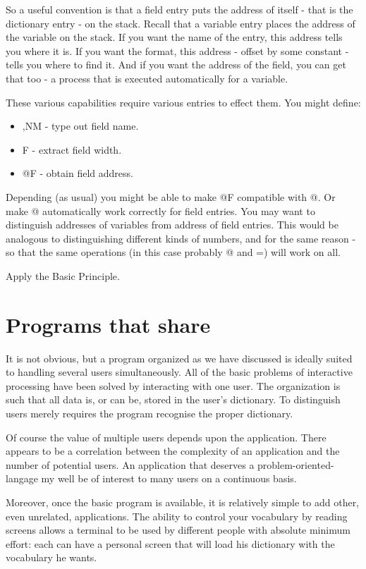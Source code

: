 \documentclass[b5paper, oneside]{book}
\begin{document}
So a useful convention is that a field entry puts the address of itself - that is the dictionary entry - on the stack. Recall that a variable entry places the address of the variable on the stack. If you want the name of the entry, this address tells you where it is. If you want the format, this address - offset by some constant - tells you where to find it. And if you want the address of the field, you can get that too - a process that is executed automatically for a variable.

These various capabilities require various entries to effect them. You might define:\begin{itemize}
   \item ,NM - type out field name.
   \item F - extract field width.
   \item @F - obtain field address.\end{itemize}
Depending (as usual) you might be able to make @F compatible with @. Or make @ automatically work correctly for field entries. You may want to distinguish addresses of variables from address of field entries. This would be analogous to distinguishing different kinds of numbers, and for the same reason - so that the same operations (in this case probably @ and =) will work on all.

Apply the Basic Principle.



\chapter{Programs that share}

It is not obvious, but a program organized as we have discussed is ideally suited to handling several users simultaneously. All of the basic problems of interactive processing have been solved by interacting with one user. The organization is such that all data is, or can be, stored in the user's dictionary. To distinguish users merely requires the program recognise the proper dictionary.

Of course the value of multiple users depends upon the application. There appears to be a correlation between the complexity of an application and the number of potential users. An application that deserves a problem-oriented-langage my well be of interest to many users on a continuous basis.

Moreover, once the basic program is available, it is relatively simple to add other, even unrelated, applications. The ability to control your vocabulary by reading screens allows a terminal to be used by different people with absolute minimum effort: each can have a personal screen that will load his dictionary with the vocabulary he wants.
\end{document}
